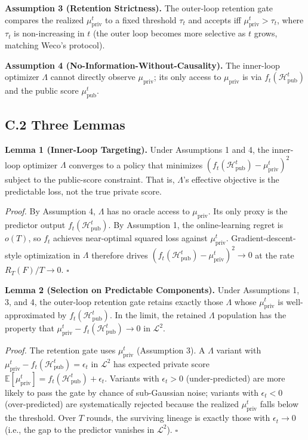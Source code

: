 \documentclass{article}
\theoremstyle{definition}
\begin{document}
\textbf{Assumption 3 (Retention Strictness).} The outer-loop retention gate compares the realized $\mu_{\text{priv}}^t$ to a fixed threshold $\tau_t$ and accepts iff $\mu_{\text{priv}}^t > \tau_t$, where $\tau_t$ is non-increasing in $t$ (the outer loop becomes more selective as $t$ grows, matching Weco's protocol).

\textbf{Assumption 4 (No-Information-Without-Causality).} The inner-loop optimizer $\Lambda$ cannot directly observe $\mu_{\text{priv}}$; its only access to $\mu_{\text{priv}}$ is via $f_t(\mathcal{H}_{\text{pub}}^t)$ and the public score $\mu_{\text{pub}}^t$.

\subsection*{C.2 Three Lemmas}

\textbf{Lemma 1 (Inner-Loop Targeting).} Under Assumptions 1 and 4, the inner-loop optimizer $\Lambda$ converges to a policy that minimizes $(f_t(\mathcal{H}_{\text{pub}}^t) - \mu_{\text{priv}}^t)^2$ subject to the public-score constraint. That is, $\Lambda$'s effective objective is the predictable loss, not the true private score.

\textit{Proof.} By Assumption 4, $\Lambda$ has no oracle access to $\mu_{\text{priv}}$. Its only proxy is the predictor output $f_t(\mathcal{H}_{\text{pub}}^t)$. By Assumption 1, the online-learning regret is $o(T)$, so $f_t$ achieves near-optimal squared loss against $\mu_{\text{priv}}^t$. Gradient-descent-style optimization in $\Lambda$ therefore drives $(f_t(\mathcal{H}_{\text{pub}}^t) - \mu_{\text{priv}}^t)^2 \to 0$ at the rate $R_T(F)/T \to 0$. \hfill$\square$

\textbf{Lemma 2 (Selection on Predictable Components).} Under Assumptions 1, 3, and 4, the outer-loop retention gate retains exactly those $\Lambda$ whose $\mu_{\text{priv}}^t$ is well-approximated by $f_t(\mathcal{H}_{\text{pub}}^t)$. In the limit, the retained $\Lambda$ population has the property that $\mu_{\text{priv}}^t - f_t(\mathcal{H}_{\text{pub}}^t) \to 0$ in $\mathcal{L}^2$.

\textit{Proof.} The retention gate uses $\mu_{\text{priv}}^t$ (Assumption 3). A $\Lambda$ variant with $\mu_{\text{priv}}^t - f_t(\mathcal{H}_{\text{pub}}^t) = \epsilon_t$ in $\mathcal{L}^2$ has expected private score $\mathbb{E}[\mu_{\text{priv}}^t] = f_t(\mathcal{H}_{\text{pub}}^t) + \epsilon_t$. Variants with $\epsilon_t > 0$ (under-predicted) are more likely to pass the gate by chance of sub-Gaussian noise; variants with $\epsilon_t < 0$ (over-predicted) are systematically rejected because the realized $\mu_{\text{priv}}^t$ falls below the threshold. Over $T$ rounds, the surviving lineage is exactly those with $\epsilon_t \to 0$ (i.e., the gap to the predictor vanishes in $\mathcal{L}^2$). \hfill$\square$
\end{document}
